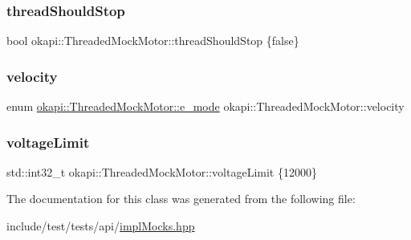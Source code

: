 \subsubsection{\texorpdfstring{threadShouldStop}{threadShouldStop}}
{\footnotesize\ttfamily bool okapi\+::\+Threaded\+Mock\+Motor\+::thread\+Should\+Stop \{false\}}

\mbox{\label{classokapi_1_1ThreadedMockMotor_a04b2c89303519e55f6e9c89f586a8ec2}} 
\subsubsection{\texorpdfstring{velocity}{velocity}}
{\footnotesize\ttfamily enum \mbox{\hyperlink{classokapi_1_1ThreadedMockMotor_a3124c100c1cd16b1d123745ab9af4291}{okapi\+::\+Threaded\+Mock\+Motor\+::e\+\_\+mode}} okapi\+::\+Threaded\+Mock\+Motor\+::velocity}

\mbox{\label{classokapi_1_1ThreadedMockMotor_a2b5cfb0ad0be5bc27d63d6969c9906bd}} 
\subsubsection{\texorpdfstring{voltageLimit}{voltageLimit}}
{\footnotesize\ttfamily std\+::int32\+\_\+t okapi\+::\+Threaded\+Mock\+Motor\+::voltage\+Limit \{12000\}}



The documentation for this class was generated from the following file\+:\begin{DoxyCompactItemize}
\item 
include/test/tests/api/\mbox{\hyperlink{implMocks_8hpp}{impl\+Mocks.\+hpp}}\end{DoxyCompactItemize}
